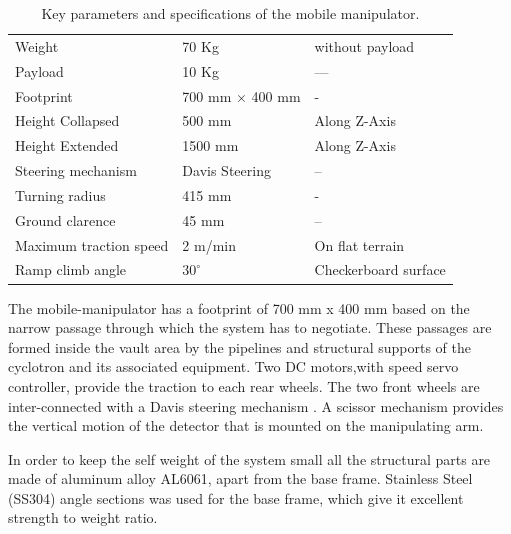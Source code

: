 %
\begin{table}[!htbp]
	\caption{Key parameters and specifications of the mobile manipulator.}
	\label{tb:specifications}
	\centering
	\begin{tabular}{l l l}
		\hline
		
		Weight  & 70 Kg & without payload \\ 
		Payload & 10 Kg &---\\
		Footprint & 700 mm $\times$  400 mm & - \\
		Height Collapsed & 500 mm  & Along  Z-Axis\\
		Height Extended & 1500 mm & Along  Z-Axis  \\
		Steering mechanism & Davis Steering & --\\
		Turning radius & 415 mm & - \\
		Ground clarence & 45 mm & --\\
		Maximum traction speed & 2 m/min & On flat terrain \\
		Ramp climb angle & $30^\circ $ & Checkerboard surface\\
		\hline
	\end{tabular}
\end{table}

The mobile-manipulator has a footprint of 700 mm x 400 mm  based on the narrow passage through which the system  has to negotiate. These passages are formed inside the vault area by the pipelines and  structural supports of the cyclotron and its associated equipment.  Two DC motors,with speed servo controller,  provide the traction to each rear wheels. The two front wheels are  inter-connected with a Davis steering mechanism \cite{TOMBook}. A scissor mechanism provides the vertical  motion of the detector that is mounted on the manipulating arm.

 In order to keep the self weight of the system small all the  structural parts are made of aluminum alloy AL6061, apart from the base frame. Stainless Steel (SS304)  angle sections was used for the base frame, which give it  excellent strength to weight ratio. 

